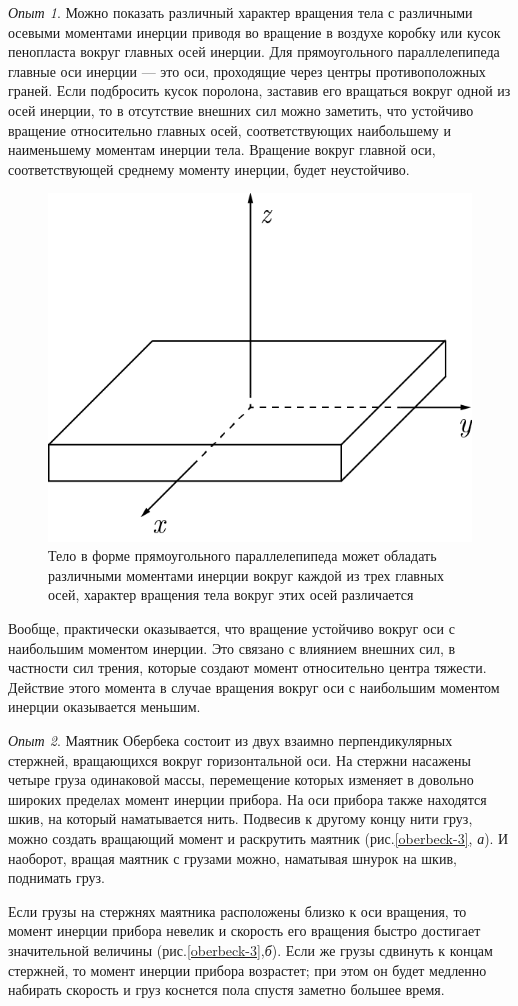 \documentclass[14pt,a4paper,oneside]{extarticle}	%
\begin{document}
	\textit{Опыт 1}. 
	Можно показать различный характер вращения тела с различными осевыми моментами инерции приводя во вращение в воздухе коробку или кусок пенопласта вокруг главных осей инерции.
	Для прямоугольного параллелепипеда главные оси инерции — это оси, проходящие через центры противоположных граней.
	Если подбросить кусок поролона, заставив его вращаться вокруг одной из осей инерции, то в отсутствие внешних сил можно заметить, что устойчиво вращение относительно главных осей, соответствующих наибольшему и наименьшему моментам инерции тела.
	Вращение вокруг главной оси, соответствующей среднему моменту инерции, будет неустойчиво.
	\begin{figure}[H] 	
		\centering 	
		\includegraphics[width=0.45\linewidth]{oberbeck-2.png}
		\caption{Тело в форме прямоугольного параллелепипеда может обладать различными моментами инерции вокруг каждой из трех главных осей, характер вращения тела вокруг этих осей различается}
		\label{oberbeck-2}
	\end{figure}
	
	Вообще, практически оказывается, что вращение устойчиво вокруг оси с наибольшим моментом инерции.
	Это связано с влиянием внешних сил, в частности сил трения, которые создают момент относительно центра тяжести.
	Действие этого момента в случае вращения вокруг оси с наибольшим моментом инерции оказывается меньшим.
	
	\textit{Опыт 2}. Маятник Обербека состоит из двух взаимно перпендикулярных стержней, вращающихся вокруг горизонтальной оси.
На стержни насажены четыре груза одинаковой массы, перемещение которых изменяет в довольно широких пределах момент инерции прибора. 
На оси прибора также находятся шкив, на который наматывается нить.
Подвесив к другому концу нити груз, можно создать вращающий момент и раскрутить маятник (рис.\ref{oberbeck-3}, \textit{а}).
И наоборот, вращая маятник с грузами можно, наматывая шнурок на шкив, поднимать груз.

Если грузы на стержнях маятника расположены близко к оси вращения, то момент инерции прибора невелик и скорость его вращения быстро достигает значительной величины (рис.\ref{oberbeck-3},\textit{б}).
Если же грузы сдвинуть к концам стержней, то момент инерции прибора возрастет; при этом он будет медленно набирать скорость и груз коснется пола спустя заметно большее время.
\end{document}
